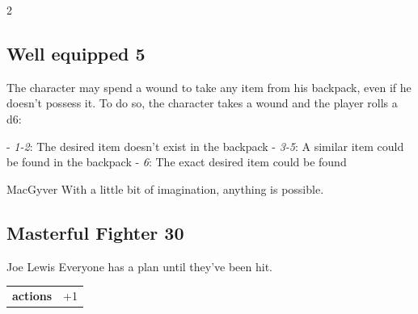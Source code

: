 \begin{multicols}{2}
\begin{tcolorbox}
\vspace{3mm}



\end{tcolorbox}

\begin{tcolorbox}
    \subsection*{Well equipped \hfill \small{5 }}
    \tcblower
The character may spend a wound to take any item from his backpack, even if he doesn't possess it. To do so, the character takes a wound and the player rolls a d6:

- \textit{1-2}: The desired item doesn't exist in the backpack
- \textit{3-5}: A similar item could be found in the backpack
- \textit{6}: The exact desired item could be found

\begin{pquote}{MacGyver}
With a little bit of imagination, anything is possible.
\end{pquote}

\vspace{3mm}



\end{tcolorbox}

\begin{tcolorbox}
    \subsection*{Masterful Fighter \hfill \small{30 }}
    \tcblower


\begin{pquote}{Joe Lewis}
Everyone has a plan until they’ve been hit.
\end{pquote}

\vspace{3mm}

\begin{tabular}{@{}ll@{}}
    \textbf{actions} & +1\\
\end{tabular}



\end{tcolorbox}
\end{multicols}
